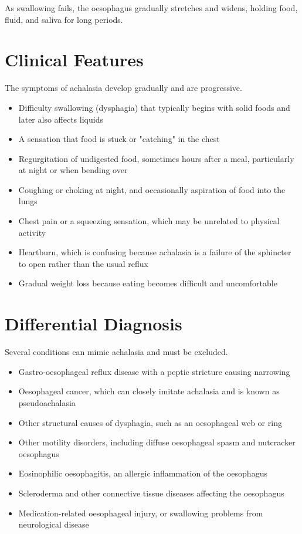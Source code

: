As swallowing fails, the oesophagus gradually stretches and widens, holding food, fluid, and saliva for long periods.

\section*{Clinical Features}
The symptoms of achalasia develop gradually and are progressive.

\begin{itemize}
    \item Difficulty swallowing (dysphagia) that typically begins with solid foods and later also affects liquids
    \item A sensation that food is stuck or "catching" in the chest
    \item Regurgitation of undigested food, sometimes hours after a meal, particularly at night or when bending over
    \item Coughing or choking at night, and occasionally aspiration of food into the lungs
    \item Chest pain or a squeezing sensation, which may be unrelated to physical activity
    \item Heartburn, which is confusing because achalasia is a failure of the sphincter to open rather than the usual reflux
    \item Gradual weight loss because eating becomes difficult and uncomfortable
\end{itemize}

\section*{Differential Diagnosis}
Several conditions can mimic achalasia and must be excluded.

\begin{itemize}
    \item Gastro-oesophageal reflux disease with a peptic stricture causing narrowing
    \item Oesophageal cancer, which can closely imitate achalasia and is known as pseudoachalasia
    \item Other structural causes of dysphagia, such as an oesophageal web or ring
    \item Other motility disorders, including diffuse oesophageal spasm and nutcracker oesophagus
    \item Eosinophilic oesophagitis, an allergic inflammation of the oesophagus
    \item Scleroderma and other connective tissue diseases affecting the oesophagus
    \item Medication-related oesophageal injury, or swallowing problems from neurological disease
\end{itemize}

